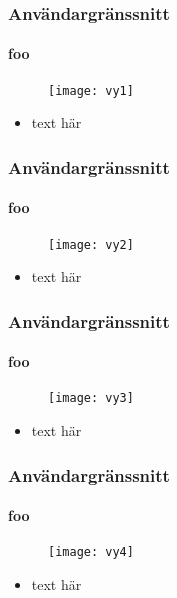 \begin{frame}
  \frametitle{Användargränssnitt}
  \framesubtitle{foo}
  \begin{figure}
    \texttt{[image: vy1]}
  \end{figure}
  \begin{itemize}
    \item text här
  \end{itemize}
\end{frame}

\begin{frame}
  \frametitle{Användargränssnitt}
  \framesubtitle{foo}
  \begin{figure}
    \texttt{[image: vy2]}
  \end{figure}
  \begin{itemize}
    \item text här
  \end{itemize}
\end{frame}

\begin{frame}
  \frametitle{Användargränssnitt}
  \framesubtitle{foo}
  \begin{figure}
    \texttt{[image: vy3]}
  \end{figure}
  \begin{itemize}
    \item text här
  \end{itemize}
\end{frame}

\begin{frame}
  \frametitle{Användargränssnitt}
  \framesubtitle{foo}
  \begin{figure}
    \texttt{[image: vy4]}
  \end{figure}
  \begin{itemize}
    \item text här
  \end{itemize}
\end{frame}


